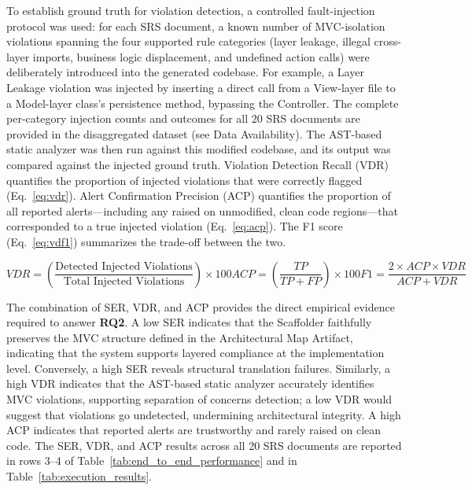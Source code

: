 To establish ground truth for violation detection, a controlled fault-injection protocol was used: for each SRS document, a known number of MVC-isolation violations spanning the four supported rule categories (layer leakage, illegal cross-layer imports, business logic displacement, and undefined action calls) were deliberately introduced into the generated codebase. For example, a Layer Leakage violation was injected by inserting a direct call from a View-layer file to a Model-layer class's persistence method, bypassing the Controller. The complete per-category injection counts and outcomes for all 20 SRS documents are provided in the disaggregated dataset (see Data Availability). The AST-based static analyzer was then run against this modified codebase, and its output was compared against the injected ground truth. Violation Detection Recall (VDR) quantifies the proportion of injected violations that were correctly flagged (Eq.~\ref{eq:vdr}). Alert Confirmation Precision (ACP) quantifies the proportion of all reported alerts---including any raised on unmodified, clean code regions---that corresponded to a true injected violation (Eq.~\ref{eq:acp}). The F1 score (Eq.~\ref{eq:vdf1}) summarizes the trade-off between the two.

\begin{subequations}
\begin{equation} \label{eq:vdr}
VDR = \left( \frac{\text{Detected Injected Violations}}{\text{Total Injected Violations}} \right) \times 100
\end{equation}

\begin{equation} \label{eq:acp}
ACP = \left( \frac{TP}{TP + FP} \right) \times 100
\end{equation}

\begin{equation} \label{eq:vdf1}
F1 = \frac{2 \times ACP \times VDR}{ACP + VDR}
\end{equation}
\end{subequations}

The combination of SER, VDR, and ACP provides the direct empirical evidence required to answer \textbf{RQ2}. A low SER indicates that the Scaffolder faithfully preserves the MVC structure defined in the Architectural Map Artifact, indicating that the system supports layered compliance at the implementation level. Conversely, a high SER reveals structural translation failures. Similarly, a high VDR indicates that the AST-based static analyzer accurately identifies MVC violations, supporting separation of concerns detection; a low VDR would suggest that violations go undetected, undermining architectural integrity. A high ACP indicates that reported alerts are trustworthy and rarely raised on clean code. The SER, VDR, and ACP results across all 20 SRS documents are reported in rows 3--4 of Table~\ref{tab:end_to_end_performance} and in Table~\ref{tab:execution_results}.

